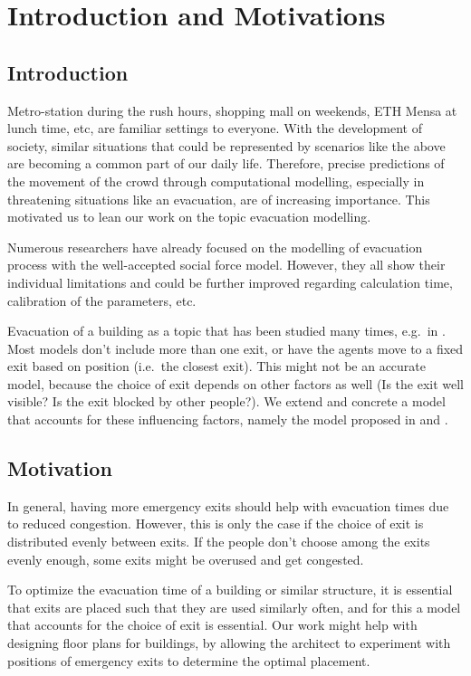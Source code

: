 \section{Introduction and Motivations} \label{sec:3-introduction}
\subsection{Introduction}
Metro-station during the rush hours, shopping mall on weekends, ETH Mensa at lunch time, etc, are familiar settings to everyone. With the development of society, similar situations that could be represented by scenarios like the above are becoming a common part of our daily life. Therefore, precise predictions of the movement of the crowd through computational modelling, especially in threatening situations like an evacuation, are of increasing importance. This motivated us to lean our work on the topic evacuation modelling.

Numerous researchers have already focused on the modelling of evacuation process with the well-accepted social force model. However, they all show their individual limitations and could be further improved regarding calculation time, calibration of the parameters, etc.

Evacuation of a building as a topic that has been studied many times,
e.g.\ in \cite{Helbing2000}. Most models don't include more than one exit, or have the agents move to a fixed exit based on position (i.e.\ the closest exit). This might not be an accurate model, because the choice of exit depends on other factors as well (Is the exit well visible? Is the exit blocked by other people?). We extend and concrete a model that accounts for these influencing factors, namely the model proposed in \cite{Zainuddin2010} and \cite{Wang2016}.


\subsection{Motivation}
In general, having more emergency exits should help with evacuation times due to reduced congestion. However, this is only the case if the choice of exit is distributed evenly between exits. If the people don't choose among the exits evenly enough, some exits might be overused and get congested.

To optimize the evacuation time of a building or similar structure, it is essential that exits are placed such that they are used similarly often, and for this a model that accounts for the choice of exit is essential. Our work might help with designing floor plans for buildings, by allowing the architect to experiment with positions of emergency exits to determine the optimal placement.


